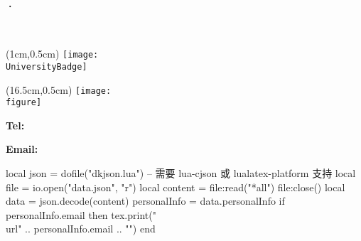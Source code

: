 \documentclass[10pt, a4paper, oneside]{ctexart}
\begin{document}
\begin{center}
    \begin{minipage}[t][6em]{1\textwidth}
        \ifdefined\noUniversityBadge
            \hspace{2em}
            {\Huge \textbf{\myname·\mytitle}}\\[1ex]
        \else
            \begin{center}
                {\Huge \textbf{\myname}}\\[1ex]
            \end{center}
            \begin{textblock*}{3cm}(1cm,0.5cm)  %
                \texttt{[image: \\UniversityBadge]}  %
            \end{textblock*}
        \fi
        \ifdefined\personalPhoto
        \begin{textblock*}{2.5cm}(16.5cm,0.5cm)  %
            \texttt{[image: \\figure]}  %
        \end{textblock*}
        \fi
        \vfil
        \begin{center}
            \begin{minipage}{1\textwidth}
                \centering
                \begin{minipage}{0.5\linewidth}
                    \textbf{Tel:} \tel
                \end{minipage}
                \hfill\begin{minipage}{0.5\linewidth}
                    \textbf{Email:}
                    \begin{luacode}
                        local json = dofile("dkjson.lua")  -- 需要 lua-cjson 或 lualatex-platform 支持
                        local file = io.open("data.json", "r")
                        local content = file:read("*all")
                        file:close()
                        local data = json.decode(content)
                        personalInfo = data.personalInfo
                        if personalInfo.email then
                            tex.print("\\url{" .. personalInfo.email .. "}")
                        end
                    \end{luacode}
                \end{minipage}
            \end{minipage}
        \end{center}
    \end{minipage}\\[1em]
\end{center}
\end{document}

